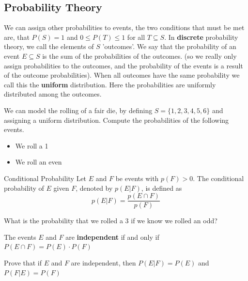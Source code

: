 \subsection{Probability Theory}
\begin{defn}
We can assign other probabilities to events, the two conditions that must be met are, that $P(S)=1$ and $0\leq P(T)\leq 1$ for all $T\subseteq S$.
\newline
In \textbf{discrete} probability theory, we call the elements of $S$ 'outcomes'. We say that the probability of an event $E\subseteq S$ is the sum of the probabilities of the outcomes. (so we really only assign probabilities to the outcomes, and the probability of the events is a result of the outcome probabilities). When all outcomes have the same probability we call this the \textbf{uniform} distribution. Here the probabilities are uniformly distributed among the outcomes.
\end{defn}
\begin{exmp}
We can model the rolling of a fair die, by defining $S=\{1,2,3,4,5,6\}$ and assigning a uniform distribution. 
\newline
Compute the probabilities of the following events. 
\newline
\begin{itemize}
\item We roll a 1
\vspace{1cm}
\item We roll an even
\vspace{1cm}
\end{itemize}
\end{exmp}
\begin{defn}{Conditional Probability}
Let $E$ and $F$ be events with $p(F) > 0$. The conditional probability of $E$ given $F$, denoted by $p(E | F)$, is defined as
\[
p(E | F) = \frac{p(E \cap F)}{p(F)}
\]
\end{defn}
\begin{exmp}What is the probability that we rolled a 3 if we know we rolled an odd?
\vspace{1cm}
\end{exmp}
\begin{defn}[Independence]
The events $E$ and $F$ are \textbf{independent} if and only if $P(E \cap F)=P(E)\cdot P(F)$
\end{defn}
\begin{exmp}Prove that if $E$ and $F$ are independent, then
\newline
$P(E|F)=P(E)$ and $P(F|E)=P(F)$
\vspace{2cm}

\end{exmp}

